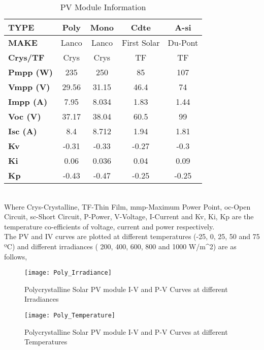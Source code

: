 \begin{table}[htbp]
  \centering
  \caption{PV Module Information}
    \begin{tabular}{|l|c|c|c|c|}
    \hline
    \textbf{TYPE} & \textbf{Poly} & \textbf{Mono} & \textbf{Cdte} & \textbf{A-si} \bigstrut\\
    \hline
    \textbf{MAKE} & Lanco & Lanco & First Solar & Du-Pont \bigstrut\\
    \hline
    \textbf{Crys/TF} & Crys & Crys & TF & TF \bigstrut\\
    \hline
    \textbf{Pmpp (W)} & 235 & 250 & 85 & 107 \bigstrut\\
    \hline
    \textbf{Vmpp (V)} & 29.56 & 31.15 & 46.4 & 74 \bigstrut\\
    \hline
    \textbf{Impp (A)} & 7.95 & 8.034 & 1.83 & 1.44 \bigstrut\\
    \hline
    \textbf{Voc (V)} & 37.17 & 38.04 & 60.5 & 99 \bigstrut\\
    \hline
    \textbf{Isc (A)} & 8.4 & 8.712 & 1.94 & 1.81 \bigstrut\\
    \hline
    \textbf{Kv} & -0.31 & -0.33 & -0.27 & -0.3 \bigstrut\\
    \hline
    \textbf{Ki} & 0.06 & 0.036 & 0.04 & 0.09 \bigstrut\\
    \hline
    \textbf{Kp} & -0.43 & -0.47 & -0.25 & -0.25 \bigstrut\\
    \hline
    \end{tabular}%
  \label{tabc3h1}%
\end{table}%
\\
Where Crys-Crystalline, TF-Thin Film, mmp-Maximum Power Point, oc-Open Circuit, sc-Short Circuit, P-Power, V-Voltage, I-Current and Kv, Ki, Kp are the temperature co-efficients of voltage, current and power respectively.\\

The PV and IV curves are plotted at different temperatures (-25, 0, 25, 50 and 75 ºC) and different irradiances ( 200, 400, 600, 800 and 1000 W/m^{2}) are as follows,

\begin{figure}[H]
\centering
\texttt{[image: Poly\_Irradiance]}
\caption{Polycrystalline Solar PV module I-V and P-V Curves at different Irradiances}
\label{figc3h15} %
\end{figure}

\begin{figure}[H]
\centering
\texttt{[image: Poly\_Temperature]}
\caption{Polycrystalline Solar PV module I-V and P-V Curves at different Temperatures}
\label{figc3h16} %
\end{figure}

